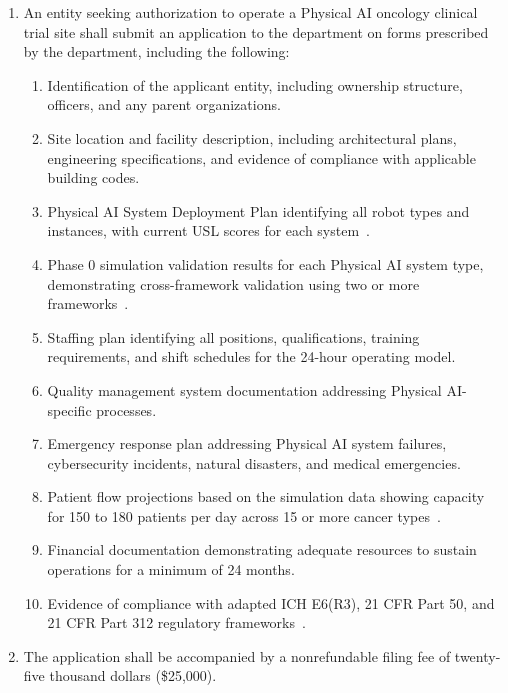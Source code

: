 \documentclass[11pt,letterpaper]{article}
\begin{document}
\begin{enumerate}[label=(\alph*)]
\item An entity seeking authorization to operate a Physical AI oncology
  clinical trial site shall submit an application to the department on forms
  prescribed by the department, including the following:
  \begin{enumerate}[label=(\arabic*)]
  \item Identification of the applicant entity, including ownership structure,
    officers, and any parent organizations.
  \item Site location and facility description, including architectural plans,
    engineering specifications, and evidence of compliance with applicable
    building codes.
  \item Physical AI System Deployment Plan identifying all robot types and
    instances, with current USL scores for each system~\cite{usl2026}.
  \item Phase 0 simulation validation results for each Physical AI system
    type, demonstrating cross-framework validation using two or more
    frameworks~\cite{iche6r3adapt}.
  \item Staffing plan identifying all positions, qualifications, training
    requirements, and shift schedules for the 24-hour operating model.
  \item Quality management system documentation addressing Physical AI-specific
    processes.
  \item Emergency response plan addressing Physical AI system failures,
    cybersecurity incidents, natural disasters, and medical emergencies.
  \item Patient flow projections based on the simulation data showing capacity
    for 150 to 180 patients per day across 15 or more cancer
    types~\cite{newtrial2026}.
  \item Financial documentation demonstrating adequate resources to sustain
    operations for a minimum of 24 months.
  \item Evidence of compliance with adapted ICH E6(R3), 21 CFR Part 50, and
    21 CFR Part 312 regulatory frameworks~\cite{iche6r3adapt,cfr50adapt,cfr312adapt}.
  \end{enumerate}

\item The application shall be accompanied by a nonrefundable filing fee of
  twenty-five thousand dollars (\$25,000).
\end{enumerate}
\end{document}
